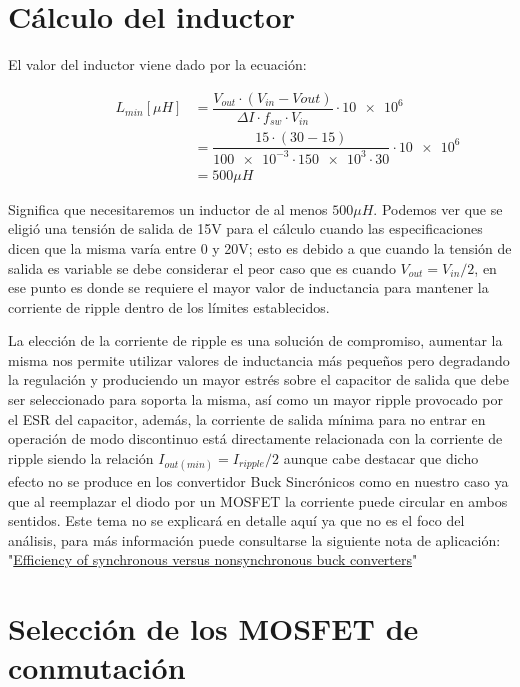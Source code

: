 \documentclass[12pt]{report}
\begin{document}
\section{Cálculo del inductor}
	
	El valor del inductor viene dado por la ecuación:
	
	\begin{equation}
		\begin{aligned}
		\qquad \qquad L_{min} [\mu H] &= \dfrac{V_{out} \cdot (V_{in} - V{out})}{\Delta I \cdot f_{sw} \cdot V_{in}} \cdot \num{10e6} \\
		& = \dfrac{15 \cdot (30 - 15)}{\num{100e-3} \cdot \num{150e3} \cdot 30} \cdot \num{10e6}\\
		& = 500 \mu H
		\end{aligned}
	\end{equation}
	
	Significa que necesitaremos un inductor de al menos $500\mu H$. Podemos ver que se eligió una tensión de salida de 15V para el cálculo cuando las especificaciones dicen que la misma varía entre 0 y 20V; esto es debido a que cuando la tensión de salida es variable se debe considerar el peor caso que es cuando $V_{out} = V_{in}/2$, en ese punto es donde se requiere el mayor valor de inductancia para mantener la corriente de ripple dentro de los límites establecidos.
	
	La elección de la corriente de ripple es una solución de compromiso, aumentar la misma nos permite utilizar valores de inductancia más pequeños pero degradando la regulación y produciendo un mayor estrés sobre el capacitor de salida que debe ser seleccionado para soporta la misma, así como un mayor ripple provocado por el ESR del capacitor, además, la corriente de salida mínima para no entrar en operación de modo discontinuo está directamente relacionada con la corriente de ripple siendo la relación $I_{out(min)} = I_{ripple}/2$ aunque cabe destacar que dicho efecto no se produce en los convertidor Buck Sincrónicos como en nuestro caso ya que al reemplazar el diodo por un MOSFET la corriente puede circular en ambos sentidos. Este tema no se explicará en detalle aquí ya que no es el foco del análisis, para más información puede consultarse la siguiente nota de aplicación: "\href{http://www.ti.com/lit/an/slyt358/slyt358.pdf}{Efficiency of synchronous versus
		nonsynchronous buck converters}"
	
\section{Selección de los MOSFET de conmutación}
	
\end{document}
